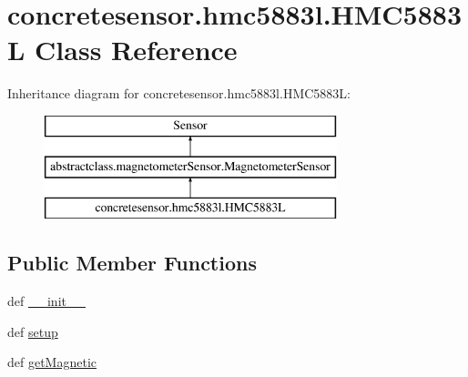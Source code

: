 \hypertarget{classconcretesensor_1_1hmc5883l_1_1HMC5883L}{}\section{concretesensor.\+hmc5883l.\+H\+M\+C5883\+L Class Reference}
\label{classconcretesensor_1_1hmc5883l_1_1HMC5883L}
Inheritance diagram for concretesensor.\+hmc5883l.\+H\+M\+C5883\+L\+:\begin{figure}[H]
\begin{center}
\leavevmode
\includegraphics[height=3.000000cm]{classconcretesensor_1_1hmc5883l_1_1HMC5883L}
\end{center}
\end{figure}
\subsection*{Public Member Functions}
\begin{DoxyCompactItemize}
\item 
def \hyperlink{classconcretesensor_1_1hmc5883l_1_1HMC5883L_ad3e5161ddd5310c1b76d4a06747d27f8}{\+\_\+\+\_\+init\+\_\+\+\_\+}
\item 
def \hyperlink{classconcretesensor_1_1hmc5883l_1_1HMC5883L_afeb99918571e754295ee8bd7aca99428}{setup}
\item 
def \hyperlink{classconcretesensor_1_1hmc5883l_1_1HMC5883L_af485334906a1dea79185ab0fc16a88c0}{get\+Magnetic}
\end{DoxyCompactItemize}
